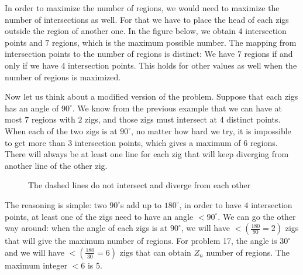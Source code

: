 In order to maximize the number of regions, we would need to maximize the number of intersections as well. For that we have to place the head of each zigs outside the region of another one. In the figure below, we obtain $4$ intersection points and $7$ regions, which is the maximum possible number. The mapping from intersection points to the number of regions is distinct: We have $7$ regions if and only if we have $4$ intersection points. This holds for other values as well when the number of regions is maximized.


Now let us think about a modified version of the problem. Suppose that each zigs has an angle of $90^{\circ}$. We know from the previous example that we can have at most $7$ regions with $2$ zigs, and those zigs must intersect at $4$ distinct points. When each of the two zigs is at $90^{\circ}$, no matter how hard we try, it is impossible to get more than $3$ intersection points, which gives a maximum of $6$ regions. There will always be at least one line for each zig that will keep diverging from another line of the other zig.
\begin{figure}[h!]
    \centering
    \caption*{The dashed lines do not intersect and diverge from each other}
    \label{fig17_2}
\end{figure}

The reasoning is simple: two $90^{\circ}$s add up to $180^{\circ}$, in order to have $4$ intersection points, at least one of the zigs need to have an angle  $<90^{\circ}$. We can go the other way around: when the angle of each zigs is at $90^{\circ}$, we will have $< (\frac{180}{90} = 2)$ zigs that will give the maximum number of regions. For problem 17, the angle is $30^{\circ}$ and we will have $< (\frac{180}{30} = 6)$ zigs that can obtain $Z_n$ number of regions. The maximum integer $<6$ is $5$.
